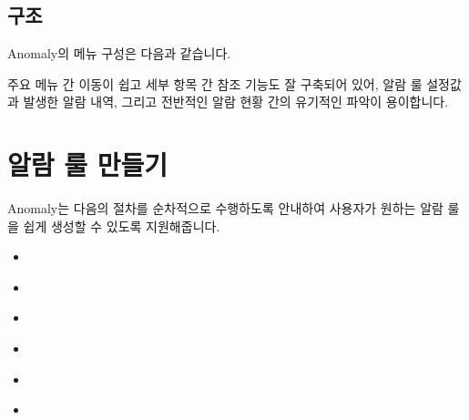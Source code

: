 \documentclass[letterpaper,10pt,english]{sphinxmanual}
\begin{document}
\section{구조}
\label{\detokenize{anomaly/part01/index:id3}}
Anomaly의 메뉴 구성은 다음과 같습니다.
\begin{quote}

\begin{figure}[H]
\centering

\noindent{}
\end{figure}
\end{quote}

주요 메뉴 간 이동이 쉽고 세부 항목 간 참조 기능도 잘 구축되어 있어, 알람 룰 설정값과 발생한 알람 내역, 그리고 전반적인 알람 현황 간의 유기적인 파악이 용이합니다.


\chapter{알람 룰 만들기}
\label{\detokenize{anomaly/part02/index:id1}}\label{\detokenize{anomaly/part02/index::doc}}
Anomaly는 다음의 절차를 순차적으로 수행하도록 안내하여 사용자가 원하는 알람 룰을 쉽게 생성할 수 있도록 지원해줍니다.
\begin{itemize}
\item {} 
{\hyperref[\detokenize{anomaly/part02/index:select-datasource}]{}}

\item {} 
{\hyperref[\detokenize{anomaly/part02/index:select-columns}]{}}

\item {} 
{\hyperref[\detokenize{anomaly/part02/index:configure-training}]{}}

\item {} 
{\hyperref[\detokenize{anomaly/part02/index:select-model}]{}}

\item {} 
{\hyperref[\detokenize{anomaly/part02/index:alarm-rule-settings}]{}}

\item {} 
{\hyperref[\detokenize{anomaly/part02/index:complete-rule}]{}}

\end{itemize}
\end{document}
